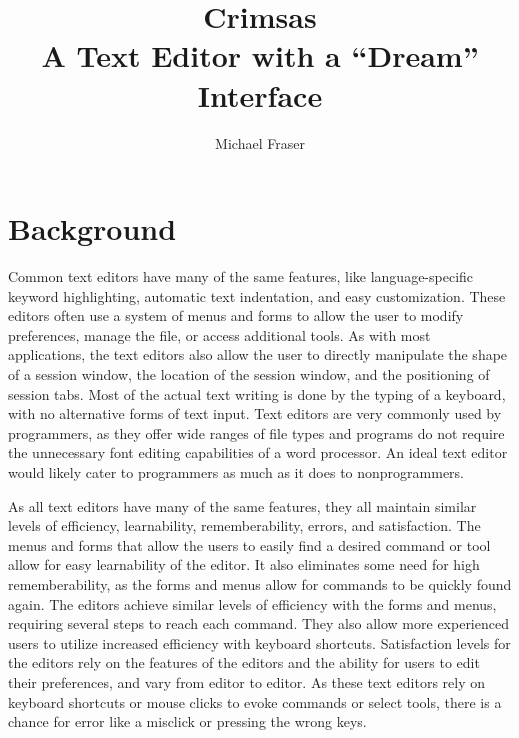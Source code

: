 \documentclass[11pt, oneside]{article}
\begin{document}
\title{Crimsas \\ A Text Editor with a ``Dream'' Interface}
\author{Michael Fraser}
\maketitle

\tableofcontents

\section{Background}
Common text editors have many of the same features, like language-specific keyword highlighting, automatic text indentation, and easy customization. These editors often use a system of menus and forms to allow the user to modify preferences, manage the file, or access additional tools. As with most applications, the text editors also allow the user to directly manipulate the shape of a session window, the location of the session window, and the positioning of session tabs. Most of the actual text writing is done by the typing of a keyboard, with no alternative forms of text input. Text editors are very commonly used by programmers, as they offer wide ranges of file types and programs do not require the unnecessary font editing capabilities of a word processor. An ideal text editor would likely cater to programmers as much as it does to nonprogrammers.

As all text editors have many of the same features, they all maintain similar levels of efficiency, learnability, rememberability, errors, and satisfaction. The menus and forms that allow the users to easily find a desired command or tool allow for easy learnability of the editor. It also eliminates some need for high rememberability, as the forms and menus allow for commands to be quickly found again. The editors achieve similar levels of efficiency with the forms and menus, requiring several steps to reach each command. They also allow more experienced users to utilize increased efficiency with keyboard shortcuts. Satisfaction levels for the editors rely on the features of the editors and the ability for users to edit their preferences, and vary from editor to editor. As these text editors rely on keyboard shortcuts or mouse clicks to evoke commands or select tools, there is a chance for error like a misclick or pressing the wrong keys. 
\end{document}
